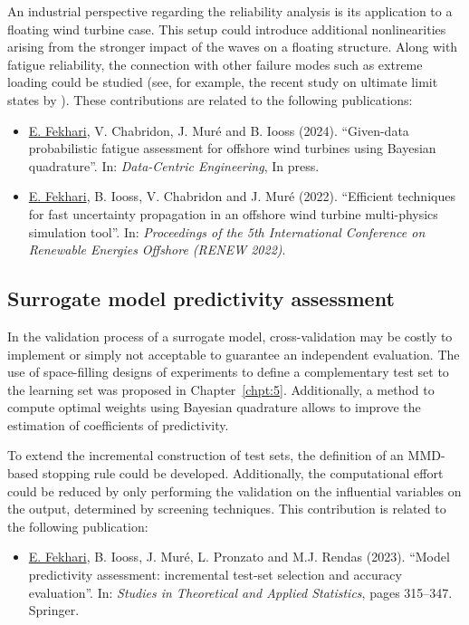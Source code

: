 An industrial perspective regarding the reliability analysis is its application to a floating wind turbine case. 
This setup could introduce additional nonlinearities arising from the stronger impact of the waves on a floating structure. 
Along with fatigue reliability, the connection with other failure modes such as extreme loading could be studied (see, for example, the recent study on ultimate limit states by \citealp{wang_schar_2023_uls}). 
These contributions are related to the following publications:
\begin{itemize}
    \footnotesize
    \item[\ding{125}] \underline{E. Fekhari}, V. Chabridon, J. Mur\'{e} and B. Iooss (2024). ``Given-data probabilistic fatigue assessment for offshore wind turbines using Bayesian quadrature''. In: \textit{Data-Centric Engineering}, In press.
    \item[\ding{125}] \underline{E. Fekhari}, B. Iooss, V. Chabridon and J. Mur\'{e} (2022). ``Efficient techniques for fast uncertainty propagation in an offshore wind turbine multi-physics simulation tool''. In: \textit{Proceedings of the 5th International Conference on Renewable Energies Offshore (RENEW 2022)}.
\end{itemize}

\subsection*{Surrogate model predictivity assessment}

In the validation process of a surrogate model, cross-validation may be costly to implement or simply not acceptable to guarantee an independent evaluation.  
The use of space-filling designs of experiments to define a complementary test set to the learning set was proposed in Chapter~\ref{chpt:5}. 
Additionally, a method to compute optimal weights using Bayesian quadrature allows to improve the estimation of coefficients of predictivity. 

To extend the incremental construction of test sets, the definition of an MMD-based stopping rule could be developed. 
Additionally, the computational effort could be reduced by only performing the validation on the influential variables on the output, determined by screening techniques. 
This contribution is related to the following publication:
\begin{itemize}
    \footnotesize
    \item[\ding{125}] \underline{E. Fekhari}, B. Iooss, J. Mur\'{e}, L. Pronzato and M.J. Rendas (2023). ``Model predictivity assessment: incremental test-set selection and accuracy evaluation''. In: \textit{Studies in Theoretical and Applied Statistics}, pages 315--347. Springer.
\end{itemize}

